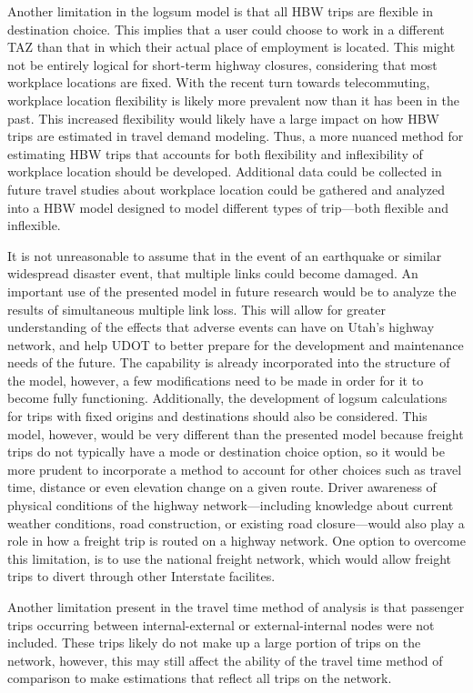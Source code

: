 Another limitation in the logsum model is that all HBW trips are flexible in
destination choice. This implies that a user could choose to work in a different
TAZ than that in which their actual place of employment is located.
This might not be entirely logical for short-term highway closures, considering that
most workplace locations are fixed. With the recent turn towards telecommuting,
workplace location flexibility is likely more prevalent now than it has been in
the past. This increased flexibility would likely have a large impact on how HBW
trips are estimated in travel demand modeling. Thus, a more nuanced method for estimating
HBW trips that accounts
for both flexibility and inflexibility of workplace location should be developed.
Additional data could be collected in future travel
studies about workplace location could be gathered
and analyzed into a HBW model designed to model different types of trip---both flexible and inflexible.

It is not unreasonable to assume that in the event of an earthquake or
similar widespread disaster event, that multiple links could become
damaged. An important use of the presented model in future research would be
to analyze the results of simultaneous multiple link
loss. This will allow for
greater understanding of the effects that adverse events can have on Utah’s
highway network, and help UDOT to better prepare for the development and
maintenance needs of the future. The capability
is already incorporated into the structure of the model, however, a few modifications
need to be made in order for it to become fully functioning.
Additionally, the development of logsum calculations for trips with fixed
origins and destinations should also be considered. This model, however,
would be very different than the presented model because freight trips
do not typically have a mode or destination choice option, so it would be
more prudent to incorporate a method to account for other choices such as travel time,
distance or even elevation change on a given route. Driver awareness of physical
conditions of the highway network---including knowledge about current weather conditions,
road construction, or existing road closure---would also play a role in how a freight trip
is routed on a highway network. One option to overcome this limitation, is to use the national
freight network, which would allow freight trips to divert through other Interstate
facilites.

Another limitation present in the travel time method of analysis is that passenger
trips occurring between internal-external or external-internal nodes were not
included. These trips likely do not make up a large portion of trips on the network,
however, this may still affect the ability of the travel time method of comparison
to make estimations that reflect all trips on the network.

